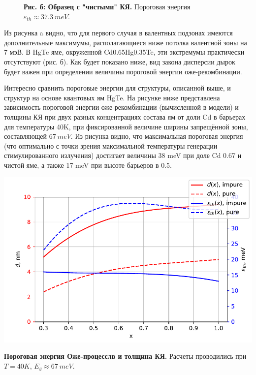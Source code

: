 \documentclass[../main.tex]{subfiles}
\begin{document}
\begin{figure}[h]
\begin{minipage}[h]{0.45\linewidth}
\begin{center}
                \textbf{Рис. б: Образец с "чистыми" КЯ.} Пороговая энергия 
                    $\varepsilon_{th} \approx 37.3~meV$.
            \end{center}
        \end{minipage}
    \end{figure}

    Из рисунка a видно, что для первого случая в валентных подзонах имеются дополнительные максимумы, располагающиеся ниже потолка валентной 
    зоны на 7 мэВ. В HgTe яме, окруженной Cd0.65Hg0.35Te, эти экстремумы практически отсутствуют (рис. б). Как будет показано ниже, вид 
    закона дисперсии дырок будет важен при определении величины пороговой энергии оже-рекомбинации.

    Интересно сравнить пороговые энергии для структуры, описанной выше, и структур на основе квантовых ям HgTe. На рисунке ниже представлена 
    зависимость пороговой энергии оже-рекомбинации (вычисленной в модели) и толщины КЯ при двух разных концентрациях состава ям
    от доли Cd в барьерах для температуры 40K, 
    при фиксированной величине ширины запрещённой зоны, составляющей $67~meV$. Из рисунка видно, что максимальная пороговая энергия (что оптимально 
    с точки зрения максимальной температуры генерации стимулированного излучения) достигает величины 38 meV при доле Cd 0.67 и чистой яме, а также 
    17 meV при высоте барьеров в 0.5.
    \vspace{0.75cm}
    \begin{minipage}[h]{\linewidth}
        \begin{center}
            \includegraphics[width=1.\linewidth]{./images/de_vs_x.pdf}

            \vspace{0.75cm}
            \textbf{Пороговая энергия Оже-процесслв и толщина КЯ.}
            Расчеты проводились при $T= 40K$, $E_g \approx 67~meV$.
            \vspace{1.25cm}
        \end{center}
    \end{minipage}
\end{document}
